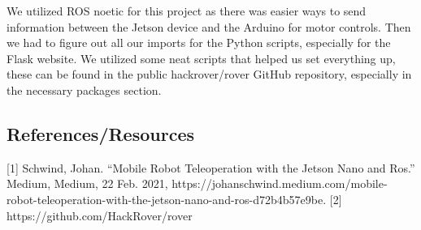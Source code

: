 \documentclass[a4paper, 10pt]{article}
\begin{document}
        We utilized ROS noetic for this project as there was easier ways to send information between the Jetson device and the Arduino for motor controls. Then we had to figure out all our imports for the Python scripts, especially for the Flask website. We utilized some neat scripts that helped us set everything up, these can be found in the public hackrover/rover GitHub repository, especially in the necessary packages section.

    \subsection{References/Resources}
		[1] Schwind, Johan. “Mobile Robot Teleoperation with the Jetson Nano and Ros.” Medium, Medium, 22 Feb. 2021, https://johanschwind.medium.com/mobile-robot-teleoperation-with-the-jetson-nano-and-ros-d72b4b57e9be. 
        [2] https://github.com/HackRover/rover


  
\end{document}
